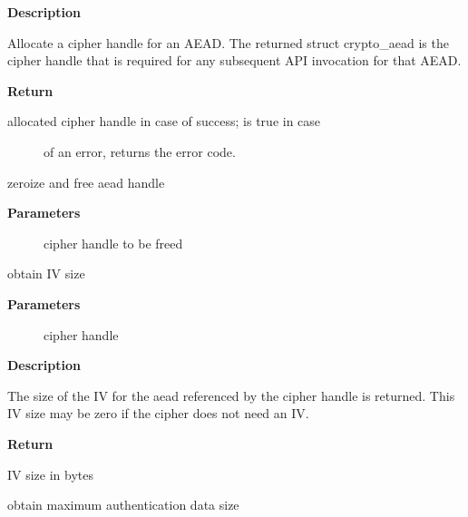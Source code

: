 \documentclass[a4paper,8pt,english]{sphinxmanual}
\begin{document}
\textbf{Description}

Allocate a cipher handle for an AEAD. The returned struct
crypto\_aead is the cipher handle that is required for any subsequent
API invocation for that AEAD.

\textbf{Return}
\begin{description}
\item[{allocated cipher handle in case of success;  is true in case}] \leavevmode
of an error,  returns the error code.

\end{description}

\begin{fulllineitems}
\label{crypto/api-aead:c.crypto_free_aead}
zeroize and free aead handle

\end{fulllineitems}


\textbf{Parameters}
\begin{description}
\item[{}] \leavevmode
cipher handle to be freed

\end{description}

\begin{fulllineitems}
\label{crypto/api-aead:c.crypto_aead_ivsize}
obtain IV size

\end{fulllineitems}


\textbf{Parameters}
\begin{description}
\item[{}] \leavevmode
cipher handle

\end{description}

\textbf{Description}

The size of the IV for the aead referenced by the cipher handle is
returned. This IV size may be zero if the cipher does not need an IV.

\textbf{Return}

IV size in bytes

\begin{fulllineitems}
\label{crypto/api-aead:c.crypto_aead_authsize}
obtain maximum authentication data size

\end{fulllineitems}
\end{document}
